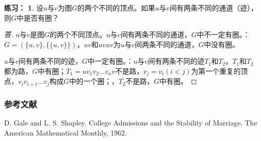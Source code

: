 \documentclass{beamer}
\theoremstyle{definition}
\theoremstyle{example}
\newtheorem*{Exercise}{练习：}
\begin{document}
\begin{CJK}{UTF8}{gbsn}
\begin{frame}
\end{frame}

\begin{frame}
  \begin{Exercise}
      设$u$与$v$为图$G$的两个不同的顶点。如果$u$与$v$间有两条不同的通道（迹），则$G$中是否有圈？
    \end{Exercise}
    \pause\begin{proof}[答]\justifying\let\raggedright\justifying
  $u$与$v$是图$G$的两个不同顶点。$u$与$v$间有两条不同的通道，$G$中不一定有圈。：$G=(\{u,v\},\{\{u,v\}\})$，$uv$和$uvuv$为$u$与$v$间两条不同的通道，$G$中没有圈。

  $u$与$v$间有两条不同的迹，$G$中一定有圈。：$u$与$v$间有两条不同的迹$T_1$和$T_2$。$T_1$和$T_2$都为路，$G$中有圈；$T_1=uv_1v_2\ldots v_nv$不是路，$v_j=v_i(i<j)$为第一个重复的顶点，$v_iv_{i+1}\ldots v_j$构成$G$中的一个圈；，$T_2$不是路，\pause$G$中有圈。
\end{proof}
\end{frame}

\begin{frame}  
  \frametitle{参考文献}

    \begin{thebibliography}{99}
  D. Gale and L. S. Shapley.
\newblock College Admissions and the Stability of Marriage.
\newblock The American Mathematical Monthly,  1962.
  \end{thebibliography}

\end{frame}

\end{CJK}


%
%
\end{document}
